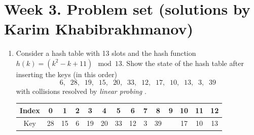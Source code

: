 \documentclass[dvipsnames]{article}
\begin{document}
\section*{Week 3. Problem set (solutions by Karim Khabibrakhmanov)}

\thispagestyle{fancy}

\begin{enumerate}

  \item Consider a hash table with 13 slots and the hash function $h(k) = (k^2 - k + 11) \mod 13$.
    Show the state of the hash table after inserting the keys (in this order)
    \[
      6,\;\; 28,\;\; 19,\;\; 15,\;\; 20,\;\; 33,\;\; 12,\;\; 17,\;\; 10,\;\; 13,\;\; 3,\;\; 39
    \]
    with collisions resolved by \emph{linear probing} \cite[\S 11.4]{Cormen2022}.

    \begin{center}
    \begin{tabular}{|c|c|c|c|c|c|c|c|c|c|c|c|c|c|}
      \hline
      Index & 0 & 1 & 2 & 3 & 4 & 5 & 6 & 7 & 8 & 9 & 10 & 11 & 12 \\
      \hline
      Key   & 28 
            & 15 
            & 6 
            & 19 
            & 20 
            & 33
            & 12
            & 3 
            & 39
            & 
            & 17 
            & 10 
            & 13  \\
      \hline
    \end{tabular}
    \end{center}


\end{enumerate}
\end{document}
